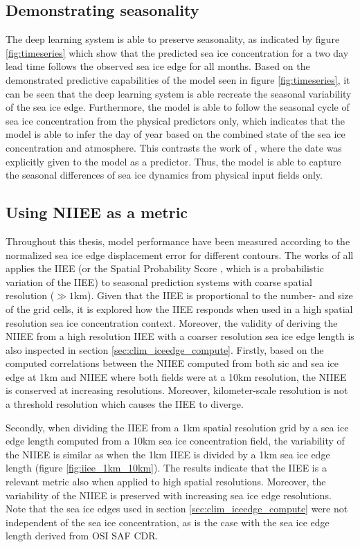 \documentclass[../main/thesis]{subfiles}
\begin{document}
\subsection{Demonstrating seasonality}
\label{sec:demonstrate_seasonality}
The deep learning system is able to preserve seasonality, as indicated by figure \ref{fig:timeseries} which show that the predicted sea ice concentration for a two day lead time follows the observed sea ice edge for all months. Based on the demonstrated predictive capabilities of the model seen in figure \ref{fig:timeseries}, it can be seen that the deep learning system is able recreate the seasonal variability of the sea ice edge. Furthermore, the model is able to follow the seasonal cycle of sea ice concentration from the physical predictors only, which indicates that the model is able to infer the day of year based on the combined state of the sea ice concentration and atmosphere. This contrasts the work of \citet{Grigoryev2022}, where the date was explicitly given to the model as a predictor. Thus, the model is able to capture the seasonal differences of sea ice dynamics from physical input fields only.

\subsection{Using NIIEE as a metric}
Throughout this thesis, model performance have been measured according to the normalized sea ice edge displacement error \citep{Goessling2016, Melsom2019, Palerme2019, Zampieri2019} for different contours. The works of \citet{Goessling2016, Palerme2019, Zampieri2019} all applies the IIEE (or the Spatial Probability Score \citep{Goessling2018}, which is a probabilistic variation of the IIEE) to seasonal prediction systems with coarse spatial resolution ($\gg1$km). Given that the IIEE is proportional to the number- and size of the grid cells, it is explored how the IIEE responds when used in a high spatial resolution sea ice concentration context. Moreover, the validity of deriving the NIIEE from a high resolution IIEE with a coarser resolution sea ice edge length is also inspected in section \ref{sec:clim_iceedge_compute}. Firstly, based on the computed correlations between the NIIEE computed from both sic and sea ice edge at 1km and NIIEE where both fields were at a 10km resolution, the NIIEE is conserved at increasing resolutions. Moreover, kilometer-scale resolution is not a threshold resolution which causes the IIEE to diverge.

Secondly, when dividing the IIEE from a 1km spatial resolution grid by a sea ice edge length computed from a 10km sea ice concentration field, the variability of the NIIEE is similar as when the 1km IIEE is divided by a 1km sea ice edge length (figure \ref{fig:iiee_1km_10km}). The results indicate that the IIEE is a relevant metric also when applied to high spatial resolutions. Moreover, the variability of the NIIEE is preserved with increasing sea ice edge resolutions. Note that the sea ice edges used in section \ref{sec:clim_iceedge_compute} were not independent of the sea ice concentration, as is the case with the sea ice edge length derived from OSI SAF CDR.
\end{document}

